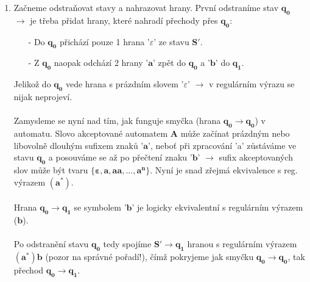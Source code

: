 \documentclass{report}
\begin{document}
\begin{enumerate}
\begin{center}
\begin{tikzpicture} [node distance = 2cm, on grid, auto]
    \end{tikzpicture}\\ \\
    \end{center}
    \pagebreak
    \item Začneme odstraňovat stavy a nahrazovat hrany. První odstraníme stav $\mathbf{q_0}$ $\rightarrow$ je třeba přidat hrany, které nahradí přechody přes $\mathbf{q_0}$:
    \begin{itemize}
        \item[-] Do $\mathbf{q_0}$ přichází pouze 1 hrana '$\varepsilon$' ze stavu $\mathbf{S'}$.
        \item[-] Z $\mathbf{q_0}$ naopak odchází 2 hrany '$\mathbf{a}$' zpět do $\mathbf{q_0}$ a  '$\mathbf{b}$' do $\mathbf{q_1}$.
    \end{itemize}
    Jelikož do $\mathbf{q_0}$ vede hrana s prázdním slovem '$\varepsilon$' $\rightarrow$ v regulárním výrazu se nijak neprojeví.\\ \\ Zamysleme se nyní nad tím, jak funguje smyčka (hrana $\mathbf{q_0 \rightarrow q_0}$) v automatu. Slovo akceptované automatem \textbf{A} může začínat prázdným nebo libovolně dlouhým sufixem znaků '$\mathbf{a}$', neboť při zpracování 'a' zůstáváme ve stavu $\mathbf{q_0}$ a posouváme se až po přečtení znaku '$\mathbf{b}$' $\rightarrow$ sufix akceptovaných slov může být tvaru $\mathbf{\{\varepsilon, a, aa, ..., a^n\}}$. Nyní je snad zřejmá ekvivalence s reg. výrazem $\mathbf{(a^*)}$.\\ \\ Hrana $\mathbf{q_0 \rightarrow q_1}$ se symbolem '$\mathbf{b}$' je logicky ekvivalentní s regulárním výrazem ($\mathbf{b}$). \\ \\ Po odstranění stavu $\mathbf{q_0}$ tedy spojíme $\mathbf{S' \rightarrow q_1}$ hranou s regulárním výrazem $\mathbf{(a^*)b}$ (pozor na správné pořadí!), čímž pokryjeme jak smyčku $\mathbf{q_0 \rightarrow q_0}$, tak přechod $\mathbf{q_0 \rightarrow q_1}$.\\ \\
\begin{center}
\end{center}
\end{enumerate}
\end{document}
